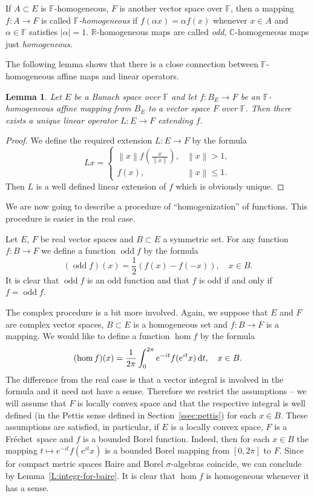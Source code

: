 \documentclass{amsart}
\numberwithin{equation}{section}
\newtheorem{lemma}[thm]{Lemma}
\theoremstyle{definition}
\def\ce{\mathbb C}
\def\ef{\mathbb F}
\def\er{\mathbb R}
\def\hom{\operatorname{hom}}
\def\odd{\operatorname{odd}}
\def\di{\,\mbox{\rm d}}
\newcommand{\norm}[1]{\left\|#1\right\|}
\newcommand{\fr}{Fr\'echet\ }
\begin{document}
If $A\subset E$ is $\ef$-homogeneous, $F$ is another vector space over $\ef$, then a mapping $f:A\to F$ is called \emph{$\ef$-homogeneous} if $f(\alpha x)=\alpha f(x)$ whenever $x\in A$ and $\alpha\in \ef$ satisfies $|\alpha|=1$. $\er$-homogeneous maps are called \emph{odd}, $\ce$-homogeneous maps just \emph{homogeneous}.

The following lemma shows that there is a close connection between $\ef$-homo\-ge\-neous affine maps and linear operators.

\begin{lemma}
\label{l:operator}
Let $E$ be a Banach space over $\ef$ and let $f\colon B_{E}\to F$ be an $\ef$-homogeneous affine mapping from $B_E$ to a vector space $F$ over $\ef$. Then there exists a unique linear operator $L\colon E\to F$ extending $f$.
\end{lemma}

\begin{proof}
We define the required extension $L\colon E\to F$ by the formula
\[
Lx=\begin{cases} \norm{x}f(\frac{x}{\norm{x}}),& \norm{x}>1,\\
                 f(x),&\norm{x}\le 1.
    \end{cases}
\]
Then $L$ is a well defined linear extension of $f$ which is obviously unique.
\end{proof}

We are now going to describe a procedure of ``homogenization'' of functions. This procedure is easier in the real case.

Let $E$, $F$ be  real vector spaces and $B\subset E$ a symmetric set. For any function $f:B\to F$ we define a function $\odd f$ by the formula
\[
(\odd f)(x)=\frac12(f(x)-f(-x)),\quad x\in B.
\]
It is clear that $\odd f$ is an odd function and that $f$ is odd if and only if $f=\odd f$.


The complex procedure is a bit more involved. Again, we suppose that $E$ and $F$ are complex vector spaces, $B\subset E$ is a homogeneous set and $f:B\to F$ is a mapping. We would like to define a function $\hom f$ by the formula
\[
(\hom f)(x)=\frac1{2\pi}\int_0^{2\pi} e^{-it}f(e^{it} x)\di t, \quad x\in B.
\]
The difference from the real case is that a vector integral is involved in the formula and it need not have a sense. Therefore we restrict the assumptions -- we will assume that  $F$ is locally convex space and that the respective integral is well defined (in the Pettis sense defined in Section~\ref{ssec:pettis}) for each $x\in B$. These assumptions are satisfied, in particular, if $E$ is a locally convex space, $F$ is a \fr space and $f$ is a bounded Borel function.
Indeed, then for each $x\in B$ the mapping $t\mapsto e^{-it}f(e^{it} x)$ is a bounded Borel mapping from $[0,2\pi]$ to $F$. Since for compact metric spaces Baire and Borel $\sigma$-algebras coincide, we can conclude by Lemma~\ref{L:integr-for-baire}.
It is clear that $\hom f$ is homogeneous whenever it has a sense.
\end{document}

